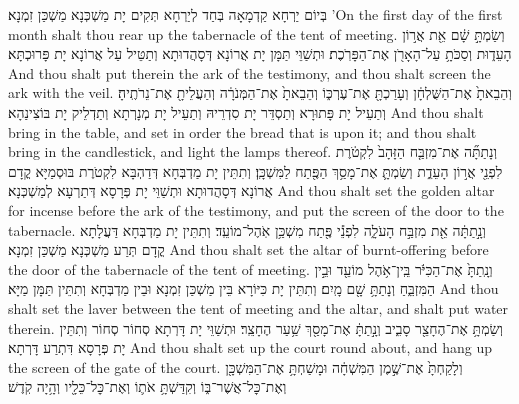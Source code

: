 {{בְּיוֹם יַרְחָא קַדְמָאָה בְּחַד לְיַרְחָא תְּקִים יָת מַשְׁכְּנָא מַשְׁכַּן זִמְנָא׃}
{’On the first day of the first month shalt thou rear up the tabernacle of the tent of meeting.}{}
{וְשַׂמְתָּ֣ שָׁ֔ם אֵ֖ת אֲר֣וֹן הָעֵד֑וּת וְסַכֹּתָ֥ עַל־הָאָרֹ֖ן אֶת־הַפָּרֹֽכֶת׃
}
{וּתְשַׁוֵּי תַּמָּן יָת אֲרוֹנָא דְּסָהֲדוּתָא וְתַטֵּיל עַל אֲרוֹנָא יָת פָּרוּכְתָּא׃}
{And thou shalt put therein the ark of the testimony, and thou shalt screen the ark with the veil.}{}
{וְהֵבֵאתָ֙ אֶת־הַשֻּׁלְחָ֔ן וְעָרַכְתָּ֖ אֶת־עֶרְכּ֑וֹ וְהֵבֵאתָ֙ אֶת־הַמְּנֹרָ֔ה וְהַעֲלֵיתָ֖ אֶת־נֵרֹתֶֽיהָ׃
}
{וְתַעֵיל יָת פָּתוּרָא וְתַסְדֵּר יָת סִדְרֵיהּ וְתַעֵיל יָת מְנָרְתָא וְתַדְלֵיק יָת בּוֹצִינַהָא׃}
{And thou shalt bring in the table, and set in order the bread that is upon it; and thou shalt bring in the candlestick, and light the lamps thereof.}{}
{וְנָתַתָּ֞ה אֶת־מִזְבַּ֤ח הַזָּהָב֙ לִקְטֹ֔רֶת לִפְנֵ֖י אֲר֣וֹן הָעֵדֻ֑ת וְשַׂמְתָּ֛ אֶת־מָסַ֥ךְ הַפֶּ֖תַח לַמִּשְׁכָּֽן׃}
{וְתִתֵּין יָת מַדְבְּחָא דְּדַהְבָּא לִקְטֹרֶת בּוּסְמַיָּא קֳדָם אֲרוֹנָא דְּסָהֲדוּתָא וּתְשַׁוֵּי יָת פְּרָסָא דְּתַרְעָא לְמַשְׁכְּנָא׃}
{And thou shalt set the golden altar for incense before the ark of the testimony, and put the screen of the door to the tabernacle.}{}
{וְנָ֣תַתָּ֔ה אֵ֖ת מִזְבַּ֣ח הָעֹלָ֑ה לִפְנֵ֕י פֶּ֖תַח מִשְׁכַּ֥ן אֹֽהֶל־מוֹעֵֽד׃}
{וְתִתֵּין יָת מַדְבְּחָא דַּעֲלָתָא קֳדָם תְּרַע מַשְׁכְּנָא מַשְׁכַּן זִמְנָא׃}
{And thou shalt set the altar of burnt-offering before the door of the tabernacle of the tent of meeting.}{}
{וְנָֽתַתָּ֙ אֶת־הַכִּיֹּ֔ר בֵּֽין־אֹ֥הֶל מוֹעֵ֖ד וּבֵ֣ין הַמִּזְבֵּ֑חַ וְנָתַתָּ֥ שָׁ֖ם מָֽיִם׃}
{וְתִתֵּין יָת כִּיּוֹרָא בֵּין מַשְׁכַּן זִמְנָא וּבֵין מַדְבְּחָא וְתִתֵּין תַּמָּן מַיָּא׃}
{And thou shalt set the laver between the tent of meeting and the altar, and shalt put water therein.}{}
{וְשַׂמְתָּ֥ אֶת־הֶחָצֵ֖ר סָבִ֑יב וְנָ֣תַתָּ֔ אֶת־מָסַ֖ךְ שַׁ֥עַר הֶחָצֵֽר׃}
{וּתְשַׁוֵּי יָת דָּרְתָא סְחוֹר סְחוֹר וְתִתֵּין יָת פְּרָסָא דִּתְרַע דָּרְתָא׃}
{And thou shalt set up the court round about, and hang up the screen of the gate of the court.}{}
{וְלָקַחְתָּ֙ אֶת־שֶׁ֣מֶן הַמִּשְׁחָ֔ה וּמָשַׁחְתָּ֥ אֶת־הַמִּשְׁכָּ֖ן וְאֶת־כׇּל־אֲשֶׁר־בּ֑וֹ וְקִדַּשְׁתָּ֥ אֹת֛וֹ וְאֶת־כׇּל־כֵּלָ֖יו וְהָ֥יָה קֹֽדֶשׁ׃}
}

